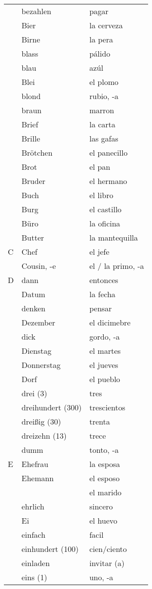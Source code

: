 \documentclass{spanish_summary}
\begin{document}
\begin{longtable}{p{} p{} | p{}}
& bezahlen & pagar  \\
& Bier & la cerveza  \\
& Birne & la pera  \\
& blass & pálido \\
& blau & azúl \\
& Blei & el plomo  \\
& blond & rubio, -a  \\
& braun & marron  \\
& Brief & la carta  \\
& Brille & las gafas  \\
& Brötchen & el panecillo  \\
& Brot & el pan \\
& Bruder & el hermano  \\
& Buch & el libro  \\
& Burg & el castillo \\
& Büro & la oficina \\
& Butter & la mantequilla  \\
C & Chef & el jefe  \\
& Cousin, -e & el / la primo, -a  \\
D & dann & entonces  \\
& Datum & la fecha  \\
& denken & pensar  \\
& Dezember & el dicimebre  \\
& dick & gordo, -a  \\
& Dienstag & el martes  \\
& Donnerstag & el jueves  \\
& Dorf & el pueblo  \\
& drei (3) & tres  \\
& dreihundert (300) & trescientos \\
& dreißig (30) & trenta  \\
& dreizehn (13) & trece  \\
& dumm & tonto, -a  \\
E & Ehefrau & la esposa  \\
& Ehemann & el esposo \\
& & el marido \\
& ehrlich & sincero\\
& Ei & el huevo  \\
& einfach & facil  \\
& einhundert (100) & cien/ciento  \\
& einladen & invitar (a)\\
& eins (1) & uno, -a\\

\end{longtable}
\end{document}
